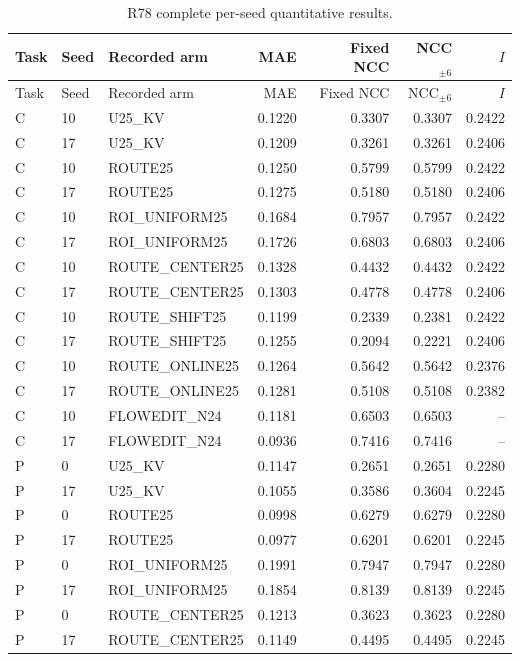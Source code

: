 \begingroup\scriptsize\setlength{\tabcolsep}{2pt}
\begin{longtable}{llp{.29\linewidth}rrrr}
\caption{R78 complete per-seed quantitative results.}\\
\hline
Task & Seed & Recorded arm & MAE & Fixed NCC & NCC$_{\pm6}$ & $I$ \\ \hline
\endfirsthead
\hline
Task & Seed & Recorded arm & MAE & Fixed NCC & NCC$_{\pm6}$ & $I$ \\ \hline
\endhead
C & 10 & U25\_KV & 0.1220 & 0.3307 & 0.3307 & 0.2422 \\
C & 17 & U25\_KV & 0.1209 & 0.3261 & 0.3261 & 0.2406 \\
C & 10 & ROUTE25 & 0.1250 & 0.5799 & 0.5799 & 0.2422 \\
C & 17 & ROUTE25 & 0.1275 & 0.5180 & 0.5180 & 0.2406 \\
C & 10 & ROI\_UNIFORM25 & 0.1684 & 0.7957 & 0.7957 & 0.2422 \\
C & 17 & ROI\_UNIFORM25 & 0.1726 & 0.6803 & 0.6803 & 0.2406 \\
C & 10 & ROUTE\_CENTER25 & 0.1328 & 0.4432 & 0.4432 & 0.2422 \\
C & 17 & ROUTE\_CENTER25 & 0.1303 & 0.4778 & 0.4778 & 0.2406 \\
C & 10 & ROUTE\_SHIFT25 & 0.1199 & 0.2339 & 0.2381 & 0.2422 \\
C & 17 & ROUTE\_SHIFT25 & 0.1255 & 0.2094 & 0.2221 & 0.2406 \\
C & 10 & ROUTE\_ONLINE25 & 0.1264 & 0.5642 & 0.5642 & 0.2376 \\
C & 17 & ROUTE\_ONLINE25 & 0.1281 & 0.5108 & 0.5108 & 0.2382 \\
C & 10 & FLOWEDIT\_N24 & 0.1181 & 0.6503 & 0.6503 & -- \\
C & 17 & FLOWEDIT\_N24 & 0.0936 & 0.7416 & 0.7416 & -- \\
P & 0 & U25\_KV & 0.1147 & 0.2651 & 0.2651 & 0.2280 \\
P & 17 & U25\_KV & 0.1055 & 0.3586 & 0.3604 & 0.2245 \\
P & 0 & ROUTE25 & 0.0998 & 0.6279 & 0.6279 & 0.2280 \\
P & 17 & ROUTE25 & 0.0977 & 0.6201 & 0.6201 & 0.2245 \\
P & 0 & ROI\_UNIFORM25 & 0.1991 & 0.7947 & 0.7947 & 0.2280 \\
P & 17 & ROI\_UNIFORM25 & 0.1854 & 0.8139 & 0.8139 & 0.2245 \\
P & 0 & ROUTE\_CENTER25 & 0.1213 & 0.3623 & 0.3623 & 0.2280 \\
P & 17 & ROUTE\_CENTER25 & 0.1149 & 0.4495 & 0.4495 & 0.2245 \\

\end{longtable}
